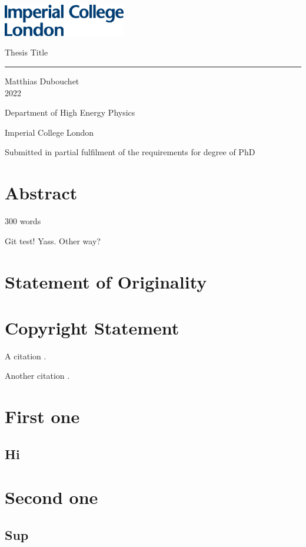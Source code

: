 \documentclass[11pt, a4paper, twoside]{report}
\begin{document}
\includegraphics[width=0.4\textwidth]{IMP_ML_1CS_4CP.eps}
\vfill
\begin{center}
    
    {\huge Thesis Title}
    
    \rule{7cm}{1pt}
    \vspace{2cm}
    
    Matthias Dubouchet\\
    2022
    \vspace{2cm}
    
    Department of High Energy Physics
    
    Imperial College London
    \vspace{2cm}
    
    Submitted in partial fulfilment of the requirements for degree of PhD
    
\end{center}

\vfill
\clearpage

\tableofcontents
\listoffigures
\listoftables
\printglossary[type=\acronymtype]

\chapter*{Abstract}

300 words

Git test! Yass. Other way?

\blindtext

\chapter*{Statement of Originality}
\blindtext

\chapter*{Copyright Statement}








A citation \cite{butter_how_2019}.

Another citation \cite{butter_how_2019}.

\appendix
\chapter{First one}
\section{Hi}
\chapter{Second one}
\section{Sup}

\printbibliography
\end{document}
